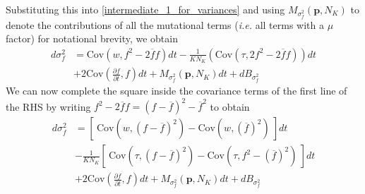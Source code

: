 Substituting this into \eqref{intermediate_1_for_variances} and using $M_{\sigma^2_f}(\mathbf{p},N_K)$ to denote the contributions of all the mutational terms (\emph{i.e.} all terms with a $\mu$ factor) for notational brevity, we obtain
\begin{equation}
\begin{aligned}
d\sigma^2_{f} &= \textrm{Cov}(w,f^2 - 2\overline{f}f)dt - \frac{1}{KN_K}\left(\textrm{Cov}(\tau,2f^2 - 2\overline{f}f)\right)dt\\
&+ 2\textrm{Cov}\left(\frac{\partial f}{\partial t},f\right)dt + M_{\sigma^2_f}(\mathbf{p},N_K)dt + dB_{\sigma^2_{f}}
\end{aligned}
\end{equation}
We can now complete the square inside the covariance terms of the first line of the RHS by writing $f^2 - 2\overline{f}f = (f - \overline{f})^2 - \overline{f}^2$ to obtain
\begin{equation}
\begin{aligned}
d\sigma^2_{f} &= \left[ \ \textrm{Cov}\left(w,(f - \overline{f})^2\right)-\textrm{Cov}\left(w, {\left(\overline{f}\right)}^2\right) \ \right]dt\\[12pt]
&- \frac{1}{KN_K}\left[ \ \textrm{Cov}\left(\tau,(f - \overline{f})^2\right) - \textrm{Cov}\left(\tau,f^2 - {\left(\overline{f}\right)}^2\right) \ \right]dt\\[12pt]
& + 2\textrm{Cov}\left(\frac{\partial f}{\partial t},f\right)dt + M_{\sigma^2_f}(\mathbf{p},N_K)dt + dB_{\sigma^2_{f}}
\end{aligned}
\end{equation}
